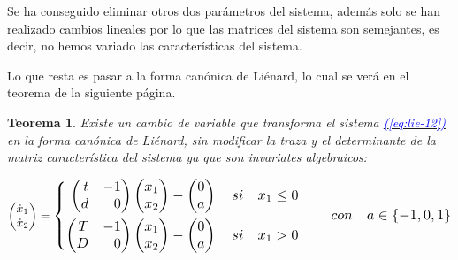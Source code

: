 \documentclass[12pt,a4paper]{report} %
\newtheorem{theorem}{Teorema}[chapter]
\newcommand{\eref}[1]{\hyperref[#1]{\textcolor{blue}{(\ref*{#1})}}}
\newcommand{\eref}[1]{\hyperref[#1]{\textcolor{blue}{\textit{(\ref*{#1})}}}}
\begin{document}
	\vspace{0.5cm}\noindent Se ha conseguido eliminar otros dos parámetros del sistema, además solo se han realizado cambios lineales por lo que las matrices del sistema son semejantes, es decir, no hemos variado las características del sistema.
	
	\vspace{0.5cm}\noindent Lo que resta es pasar a la forma canónica de Liénard, lo cual se verá en el teorema de la siguiente página.
	
	\newpage
	
	\begin{theorem}\label{t2}
		Existe un cambio de variable que transforma el sistema \eref{eq:lie-12} en la forma canónica de Liénard, sin modificar la traza y el determinante de la matriz característica del sistema ya que son invariates algebraicos:
	\end{theorem}
	
	\begin{equation}
		\begin{pmatrix*}[r]
			\dot{x}_1 \\ \dot{x}_2
		\end{pmatrix*}=
		\label{eq:lienard}
		\scalebox{1.2}{$\displaystyle
			\left\{
			\begin{aligned}
				\begin{pmatrix*}[r]
					t & -1\\
					d & 0
				\end{pmatrix*}\begin{pmatrix*}[r]
				x_1\\x_2
				\end{pmatrix*}-\begin{pmatrix}
				0\\a
				\end{pmatrix} \quad si \quad x_1\leq 0 \\
				\begin{pmatrix*}[r]
					T & -1\\
					D & 0
				\end{pmatrix*}\begin{pmatrix*}[r]
				x_1\\x_2
				\end{pmatrix*}-\begin{pmatrix}
					0\\a
				\end{pmatrix} \quad si \quad x_1 > 0
			\end{aligned}
			\right. \qquad con\quad a \in \left\{-1,0,1\right\}
			$}
	\end{equation}\smallskip
\end{document}
